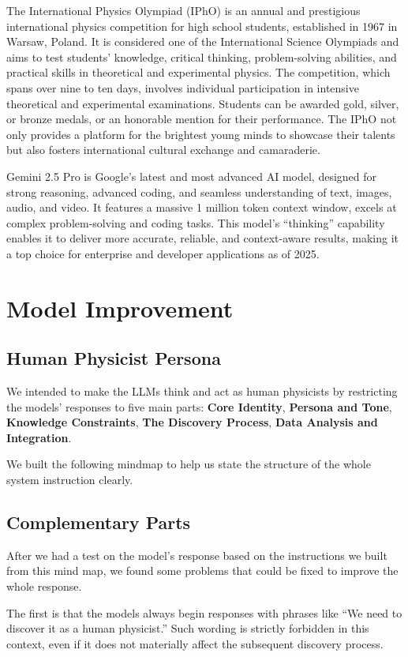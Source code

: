 \documentclass[12pt]{article}
\begin{document}
The International Physics Olympiad (IPhO) is an annual and prestigious international physics competition for high school students, established in 1967 in Warsaw, Poland. It is considered one of the International Science Olympiads and aims to test students' knowledge, critical thinking, problem-solving abilities, and practical skills in theoretical and experimental physics. The competition, which spans over nine to ten days, involves individual participation in intensive theoretical and experimental examinations. Students can be awarded gold, silver, or bronze medals, or an honorable mention for their performance. The IPhO not only provides a platform for the brightest young minds to showcase their talents but also fosters international cultural exchange and camaraderie.

Gemini 2.5 Pro is Google’s latest and most advanced AI model, designed for strong reasoning, advanced coding, and seamless understanding of text, images, audio, and video. It features a massive 1 million token context window, excels at complex problem-solving and coding tasks. This model’s “thinking” capability enables it to deliver more accurate, reliable, and context-aware results, making it a top choice for enterprise and developer applications as of 2025. 

\section{Model Improvement}
\subsection{Human Physicist Persona}
We intended to make the LLMs think and act as human physicists by restricting the models' responses to five main parts: \textbf{Core Identity}, \textbf{Persona and Tone}, \textbf{Knowledge Constraints}, \textbf{The Discovery Process}, \textbf{Data Analysis and Integration}.

We built the following mindmap to help us state the structure of the whole system instruction clearly. 

\subsection{Complementary Parts}
After we had a test on the model’s response based on the instructions we built from this mind map, we found some problems that could be fixed to improve the whole response.  

The first is that the models always begin responses with phrases like “We need to discover it as a human physicist.” Such wording is strictly forbidden in this context, even if it does not materially affect the subsequent discovery process.
\end{document}
